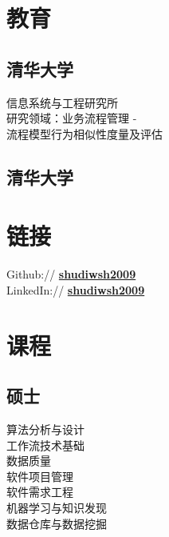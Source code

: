 \documentclass[]{resume_zh}
\begin{document}
\begin{minipage}[t]{0.3\textwidth} 


\section{教育} 

\subsection{清华大学}
信息系统与工程研究所\\
研究领域：业务流程管理 - \\
流程模型行为相似性度量及评估
\sectionsep

\subsection{清华大学}
\sectionsep


\section{链接} 
Github:// \href{https://github.com/shudiwsh2009}{\bf shudiwsh2009} \\
LinkedIn://  \href{https://cn.linkedin.com/in/shudiwsh2009}{\bf shudiwsh2009} \\
\sectionsep


\section{课程}
\subsection{硕士}
算法分析与设计\\
工作流技术基础\\
数据质量\\
软件项目管理\\
软件需求工程\\
机器学习与知识发现\\
数据仓库与数据挖掘\\
\sectionsep


\end{minipage}
\end{document}

